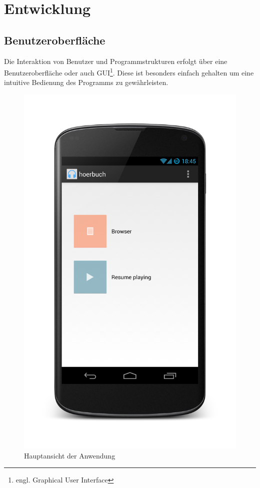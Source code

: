 \section{Entwicklung}

\subsection{Benutzeroberfläche}

Die Interaktion von Benutzer und Programmstrukturen erfolgt über eine Benutzeroberfläche oder auch GUI\footnote{engl. Graphical User Interface}. Diese ist besonders einfach gehalten um eine intuitive Bedienung des Programms zu gewährleisten.

\begin{figure}[h!t]
\begin{center}
\includegraphics[scale=.2]{images/mainscreen}
\caption{Hauptansicht der Anwendung}
\label{mainscreen}
\end{center}
\end{figure}

